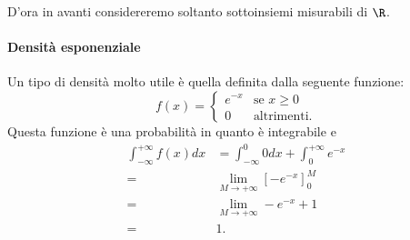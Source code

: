 D'ora in avanti considereremo soltanto sottoinsiemi misurabili di $\R$.

\paragraph{Densità esponenziale} Un tipo di densità molto utile è quella definita dalla seguente funzione: \[
    f(x) = \begin{cases}
        e^{-x} &\text{se } x \geq 0\\
        0 &\text{altrimenti.}
    \end{cases}    
\] Questa funzione è una probabilità in quanto è integrabile e \begin{align*}
    \int_{-\infty}^{+\infty} f(x)dx &= \int_{-\infty}^0 0dx + \int_0^{+\infty} e^{-x} \\
    = &\lim_{M \to +\infty} \left[ -e^{-x} \right]_0^M \\
    = &\lim_{M \to +\infty} -e^{-x} + 1 \\
    = &1.
\end{align*}